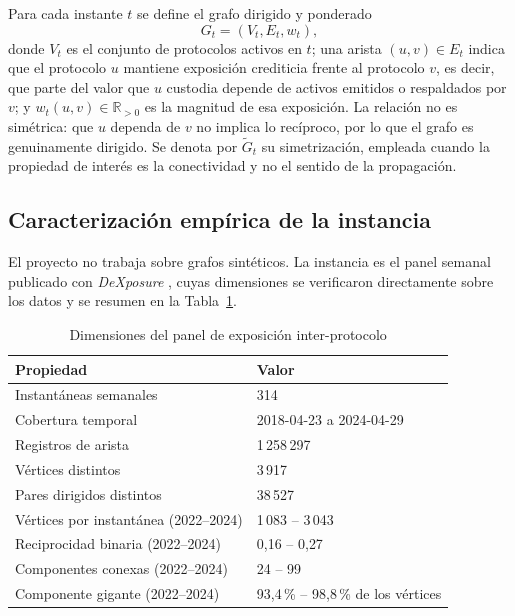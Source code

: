 \documentclass[journal]{IEEEtran}
\begin{document}
Para cada instante $t$ se define el grafo dirigido y ponderado
\[
G_t = (V_t, E_t, w_t),
\]
donde $V_t$ es el conjunto de protocolos activos en $t$; una arista
$(u,v) \in E_t$ indica que el protocolo $u$ mantiene exposición crediticia frente
al protocolo $v$, es decir, que parte del valor que $u$ custodia depende de
activos emitidos o respaldados por $v$; y $w_t(u,v) \in \mathbb{R}_{>0}$ es la
magnitud de esa exposición. La relación no es simétrica: que $u$ dependa de $v$ no
implica lo recíproco, por lo que el grafo es genuinamente dirigido. Se denota por
$\tilde{G}_t$ su simetrización, empleada cuando la propiedad de interés es la
conectividad y no el sentido de la propagación.

\subsection{Caracterización empírica de la instancia}

El proyecto no trabaja sobre grafos sintéticos. La instancia es el panel semanal
publicado con \emph{DeXposure} \cite{wu2025dexposure}, cuyas dimensiones se
verificaron directamente sobre los datos y se resumen en la Tabla~\ref{tab:datos}.

\begin{table}[!t]
\renewcommand{\arraystretch}{1.25}
\caption{Dimensiones del panel de exposición inter-protocolo}
\label{tab:datos}
\centering
\begin{tabular}{ll}
\toprule
\textbf{Propiedad} & \textbf{Valor} \\
\midrule
Instantáneas semanales      & 314 \\
Cobertura temporal          & 2018-04-23 a 2024-04-29 \\
Registros de arista         & 1\,258\,297 \\
Vértices distintos          & 3\,917 \\
Pares dirigidos distintos   & 38\,527 \\
Vértices por instantánea (2022--2024) & 1\,083 -- 3\,043 \\
Reciprocidad binaria (2022--2024) & 0{,}16 -- 0{,}27 \\
Componentes conexas (2022--2024)  & 24 -- 99 \\
Componente gigante (2022--2024)   & 93{,}4\,\% -- 98{,}8\,\% de los vértices \\
\bottomrule
\end{tabular}
\end{table}
\end{document}

